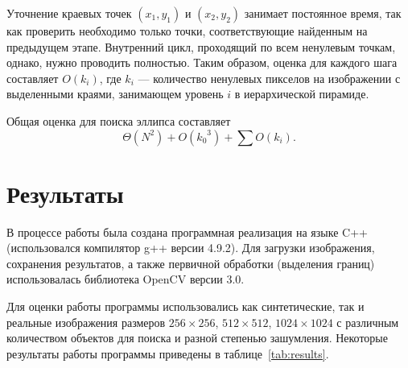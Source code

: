 Уточнение краевых точек \((x_1,y_1)\) и \((x_2,y_2)\) занимает постоянное время, так как проверить необходимо только точки, соответствующие найденным на предыдущем этапе.
Внутренний цикл, проходящий по всем ненулевым точкам, однако, нужно проводить полностью. 
Таким образом, оценка для каждого шага составляет \(O(k_i)\), где \(k_i\) --- количество ненулевых пикселов на изображении с выделенными краями, занимающем уровень \(i\) в иерархической пирамиде.

Общая оценка для поиска эллипса составляет \[\Theta(N^2) + \displaystyle O({k_0}^3) + \sum O(k_i) .\]
\section{Результаты}
В процессе работы была создана программная реализация на языке C++ (использовался компилятор g++ версии 4.9.2). 
Для загрузки изображения, сохранения результатов, а также первичной обработки (выделения границ) использовалась библиотека OpenCV версии 3.0.

Для оценки работы программы использовались как синтетические, так и реальные изображения размеров $256\times256$, $512\times512$, $1024\times1024$ с различным количеством объектов для поиска и разной степенью зашумления.
Некоторые результаты работы программы приведены в таблице~\ref{tab:results}.

